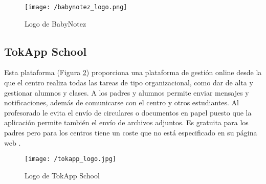 \begin{figure}[!h]
	\begin{center}
		\texttt{[image: /babynotez\_logo.png]}
		\caption{Logo de BabyNotez}
		\label{fig:babynotez}
	\end{center}
\end{figure}

\newpage

\subsection{TokApp School}
Esta plataforma (Figura \ref{fig:tokapp}) proporciona una plataforma de gestión online desde la que el centro realiza todas las tareas de tipo organizacional, como dar de alta y gestionar alumnos y clases. A los padres y alumnos permite enviar mensajes y notificaciones, además de comunicarse con el centro y otros estudiantes. Al profesorado le evita el envío de circulares o documentos en papel puesto que la aplicación permite también el envío de archivos adjuntos. Es gratuita para los padres pero para los centros tiene un coste que no está especificado en su página web \cite{Educo2016}.

\begin{figure}[!h]
	\begin{center}
		\texttt{[image: /tokapp\_logo.jpg]}
		\caption{Logo de TokApp School}
		\label{fig:tokapp}
	\end{center}
\end{figure}


